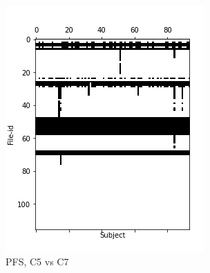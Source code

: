 \documentclass[10pt, conference, compsocconf]{IEEEtran}
\begin{document}
\begin{figure}[h!]
\begin{subfigure}[b]{0.45\columnwidth}
         \includegraphics[width=\columnwidth]{data/Utility_Matrix/PreFreeSurfer/PFS_5v7_utility_matrix.png}
  \caption{PFS, C5 vs C7}
  \end{subfigure}
  \begin{subfigure}[b]{0.45\columnwidth}

\end{subfigure}
\end{figure}
\end{document}
